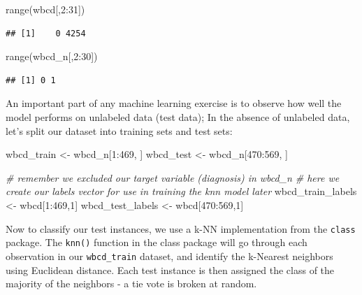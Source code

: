 \documentclass[
]{article}
\newenvironment{Shaded}{\begin{snugshade}}{\end{snugshade}}
\newcommand{\CommentTok}[1]{\textcolor[rgb]{0.56,0.35,0.01}{\textit{#1}}}
\newcommand{\DecValTok}[1]{\textcolor[rgb]{0.00,0.00,0.81}{#1}}
\newcommand{\FunctionTok}[1]{\textcolor[rgb]{0.00,0.00,0.00}{#1}}
\newcommand{\NormalTok}[1]{#1}
\newcommand{\OtherTok}[1]{\textcolor[rgb]{0.56,0.35,0.01}{#1}}
\newcommand{\SpecialCharTok}[1]{\textcolor[rgb]{0.00,0.00,0.00}{#1}}
\begin{document}
\begin{Shaded}
\begin{Highlighting}[]
\FunctionTok{range}\NormalTok{(wbcd[,}\DecValTok{2}\SpecialCharTok{:}\DecValTok{31}\NormalTok{])}
\end{Highlighting}
\end{Shaded}

\begin{verbatim}
## [1]    0 4254
\end{verbatim}

\begin{Shaded}
\begin{Highlighting}[]
\FunctionTok{range}\NormalTok{(wbcd\_n[,}\DecValTok{2}\SpecialCharTok{:}\DecValTok{30}\NormalTok{])}
\end{Highlighting}
\end{Shaded}

\begin{verbatim}
## [1] 0 1
\end{verbatim}

An important part of any machine learning exercise is to observe how
well the model performs on unlabeled data (test data); In the absence of
unlabeled data, let's split our dataset into training sets and test
sets:

\begin{Shaded}
\begin{Highlighting}[]
\NormalTok{wbcd\_train }\OtherTok{\textless{}{-}}\NormalTok{ wbcd\_n[}\DecValTok{1}\SpecialCharTok{:}\DecValTok{469}\NormalTok{, ]}
\NormalTok{wbcd\_test }\OtherTok{\textless{}{-}}\NormalTok{ wbcd\_n[}\DecValTok{470}\SpecialCharTok{:}\DecValTok{569}\NormalTok{, ]}

\CommentTok{\# remember we excluded our target variable (diagnosis) in wbcd\_n}
\CommentTok{\# here we create our labels vector for use in training the knn model later}
\NormalTok{wbcd\_train\_labels }\OtherTok{\textless{}{-}}\NormalTok{ wbcd[}\DecValTok{1}\SpecialCharTok{:}\DecValTok{469}\NormalTok{,}\DecValTok{1}\NormalTok{]}
\NormalTok{wbcd\_test\_labels }\OtherTok{\textless{}{-}}\NormalTok{ wbcd[}\DecValTok{470}\SpecialCharTok{:}\DecValTok{569}\NormalTok{,}\DecValTok{1}\NormalTok{]}
\end{Highlighting}
\end{Shaded}

Now to classify our test instances, we use a k-NN implementation from
the \texttt{class} package. The \texttt{knn()} function in the class
package will go through each observation in our \texttt{wbcd\_train}
dataset, and identify the k-Nearest neighbors using Euclidean distance.
Each test instance is then assigned the class of the majority of the
neighbors - a tie vote is broken at random.
\end{document}
